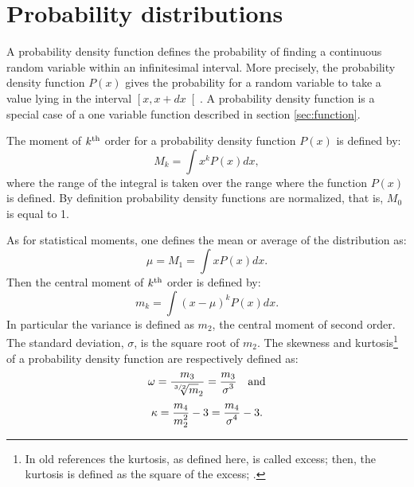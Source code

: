 \section{Probability distributions}
\label{sec:probdistr}A probability density function defines the
probability of finding a continuous random variable within an
infinitesimal interval. More precisely, the probability density
function $P\left(x\right)$ gives the probability for a random
variable to take a value lying in the interval
$\left[x,x+dx\right[$. A probability density function is a special
case of a one variable function described in section
\ref{sec:function}.

The moment of $k^{\mathop{\rm th}}$ order for a probability
density function $P\left(x\right)$ is defined by:
\begin{equation}
\label{eq:probdensity}
  M_k=\int x^k P\left(x\right) dx,
\end{equation}
where the range of the integral is taken over the range where the
function $P\left(x\right)$ is defined. By definition probability
density functions are normalized, that is, $M_0$ is equal to 1.

As for statistical moments, one defines the mean or average of the
distribution as:
\begin{equation}
  \mu=M_1=\int x P\left(x\right) dx.
\end{equation}
Then the central moment of $k^{\mathop{\rm th}}$ order is defined
by:
\begin{equation}
  m_k=\int \left(x-\mu\right)^k P\left(x\right) dx.
\end{equation}
In particular the variance is defined as $m_2$, the central moment
of second order. The standard deviation, $\sigma$, is the square
root of $m_2$. The skewness and kurtosis\footnote{In old
references the kurtosis, as defined here, is called excess; then,
the kurtosis is defined as the square of the excess;
\cite{AbrSteg} \eg.} of a probability density function are
respectively defined as:
\begin{equation}
  \omega={\displaystyle m_3 \over\displaystyle {\root 3/2 \of m_2}}
  ={\displaystyle m_3 \over\displaystyle \sigma^3}\mbox{\quad and}
\end{equation}
\begin{equation}
  \kappa={\displaystyle m_4 \over\displaystyle m_2^2}-3
  ={\displaystyle m_4 \over\displaystyle \sigma^4}-3.
\end{equation}


